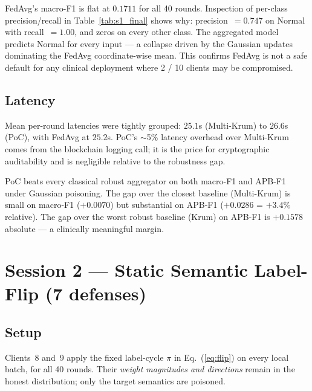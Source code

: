 \documentclass[11pt,a4paper]{article}
\begin{document}
\begin{warningbox}
FedAvg's macro-F1 is flat at $0.1711$ for all 40 rounds. Inspection of
per-class precision/recall in Table~\ref{tab:s1_final} shows why:
precision~$=0.747$ on Normal with recall~$=1.00$, and zeros on every
other class. The aggregated model predicts Normal for every input --- a
collapse driven by the Gaussian updates dominating the FedAvg coordinate-wise
mean. This confirms FedAvg is not a safe default for any clinical
deployment where 2 / 10 clients may be compromised.
\end{warningbox}

\subsection{Latency}

Mean per-round latencies were tightly grouped: $25.1$s (Multi-Krum)
to $26.6$s (PoC), with FedAvg at $25.2$s. PoC's $\sim$5\% latency
overhead over Multi-Krum comes from the blockchain logging call; it is
the price for cryptographic auditability and is negligible relative to
the robustness gap.

\begin{successbox}
PoC beats every classical robust aggregator on both macro-F1 and APB-F1
under Gaussian poisoning. The gap over the closest baseline (Multi-Krum)
is small on macro-F1 ($+0.0070$) but substantial on APB-F1
($+0.0286$ = $+3.4\%$ relative). The gap over the worst robust baseline
(Krum) on APB-F1 is $+0.1578$ absolute --- a clinically meaningful margin.
\end{successbox}

\newpage
\section{Session 2 --- Static Semantic Label-Flip (7 defenses)}
\label{sec:session2}

\subsection{Setup}

Clients~8 and~9 apply the fixed label-cycle $\pi$ in
Eq.~(\ref{eq:flip}) on every local batch, for all 40 rounds. Their
\textit{weight magnitudes and directions} remain in the honest
distribution; only the target semantics are poisoned.
\end{document}
